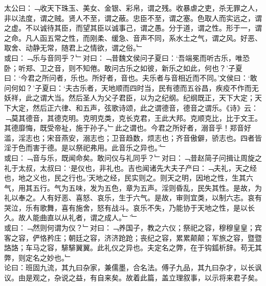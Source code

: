 太公曰：﹁收天下珠玉、美女、金银、彩帛，谓之残。收暴虐之吏，杀无罪之人，非以法度，谓之贼。贤人不至，谓之蔽。忠臣不至，谓之塞。色取人而实远之，谓之虚。不以诚待其臣，而望其臣以诚事己，谓之愚。分于道，谓之性。形于一，谓之命。凡人函五常之性，而刚柔、缓急、音声不同，系水土之气，谓之风。好恶、取舍、动静无常，随君上之情欲，谓之俗。﹂\\
或曰：﹁乐与音同乎？﹂对曰：﹁昔魏文侯问子夏曰：‘吾端冕而听古乐，唯恐卧；听郑、卫之音，则不知倦。敢问古乐之如彼，新乐之如此，何也？’子夏曰：‘今君之所问者，乐也。所好者，音也。夫乐者与音相近而不同。’文侯曰：‘敢问何如？’子夏曰：‘夫古乐者，天地顺而四时当，民有德而五谷昌，疾疫不作而无妖祥，此之谓大当。然后圣人为父子君臣，以为之纪纲。纪纲既正，天下大定；天下大定，然后正六律、和五声，弦歌诗颂，此之谓德音，德音之谓乐。《诗》云：﹁莫其德音，其德克明。克明克类，克长克君，王此大邦。克顺克比，比于文王。其德靡悔，既受帝祉，施于孙子。﹂此之谓也。今君之所好者，溺音乎！郑音好滥，淫志也；宋音燕安，溺志也；卫音趋数，烦志也；齐音傲僻，骄志也。四者皆淫于色而害于德。是以祭祀弗用。此音乐之异也。’﹂\\
或曰：﹁音与乐，既闻命矣。敢问仪与礼同乎？﹂对曰：﹁昔赵简子问揖让周旋之礼于太叔，太叔曰：‘是仪也，非礼也。吉也闻诸先大夫子产曰：﹁夫礼，天之经也，地之义也，民之行也。’天地之经，民实则之。则天之明，因地之性，生其六气，用其五行。气为五味，发为五色，章为五声。淫则昏乱，民失其性。是故，为礼以奉之。人有好恶、喜怒、哀乐，生于六气。是故，审则宜类，以制六志。哀有哭泣，乐有歌舞，喜有施舍，怒有战斗。哀乐不失，乃能协于天地之性，是以长久。故人能曲直以从礼者，谓之成人。﹂’﹂\\
或曰：﹁然则何谓为仪？﹂对曰：﹁养国子，教之六仪；祭祀之容，穆穆皇皇；宾客之容，俨恪矜庄；朝廷之容，济济跄跄；丧纪之容，累累颠颠；军旅之容，暨暨詻詻；车马之容，騑騑翼翼。此礼仪之异也。夫定名之弊，在于钩鈲析辞。苟无其弊，则定名之妙也。﹂\\
论曰：班固九流，其九曰杂家，兼儒墨，合名法。傅子九品，其九曰杂才，以长讽议。由是观之，杂说之益，有自来矣。故着此篇，盖立理叙事，以示将来君子矣。
%
%
